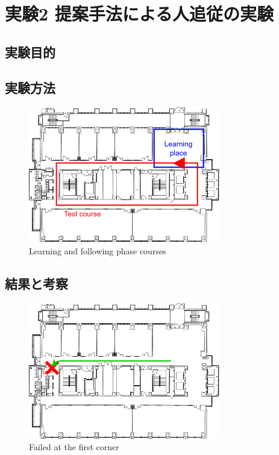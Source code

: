\section{実験2 提案手法による人追従の実験}

\subsection{実験目的}
\subsection{実験方法}

  \begin{figure}[h]
    \centering
    \includegraphics[keepaspectratio, scale=0.80] {images/RobotGuidance_course.png}
    \captionsetup{justification=raggedright} %
    \caption{Learning and following phase courses}
    \label{Fig:RobotGuidance_course}
  \end{figure}

\subsection{結果と考察}

  \begin{figure}[h]
    \centering
    \includegraphics[keepaspectratio, scale=0.80] {images/RobotGuidance_failed_experiment.png}
    \captionsetup{justification=raggedright} %
    \caption{Failed at the first corner}
    \label{Fig:RobotGuidance_failed_experiment}
  \end{figure}

